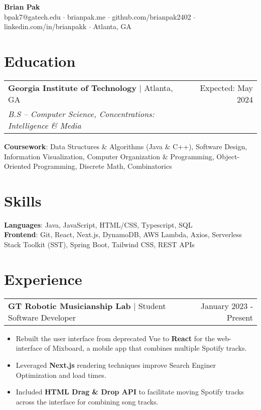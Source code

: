 \documentclass[letterpaper,11pt]{article}
\makeatletter
\newcommand{\resumeEducationHeading}[5]{
    \begin{tabular*}{0.99\textwidth}[t]{l@{\extracolsep{\fill}}r}
      \textbf{#1} $\vert$ #2 & #3 \\
      \textit{\small#4} & \textit{\small #5} \\
    \end{tabular*}\vspace{0.5pt}
}
\newcommand{\resumeExperienceHeading}[3]{
    \begin{tabular*}{0.99\textwidth}[t]{l@{\extracolsep{\fill}}r}
      \textbf{#1} $\vert$ {#2} & {#3} \\
    \end{tabular*}\vspace{-3pt}
}
\newcommand{\resumeItemListStart}{\begin{itemize}[noitemsep]\vspace{-4pt}}
\newcommand{\resumeItemListEnd}{\end{itemize}}
\makeatother
\begin{document}
\begin{center}
  \textbf{\huge Brian Pak} \\
  \vspace*{0.1cm}
  {bpak7@gatech.edu} $\cdot$ {brianpak.me} $\cdot$ {github.com/brianpak2402} $\cdot$ {linkedin.com/in/brianpakk}  $\cdot$ Atlanta, GA
\end{center}

\section{Education}
    \resumeEducationHeading
      {Georgia Institute of Technology}{Atlanta, GA}{Expected: May 2024}
      {B.S -- Computer Science, Concentrations: Intelligence \& Media}{\vspace{0.1cm}} 
    \textbf{Coursework}{: Data Structures \& Algorithms (Java \& C++), Software Design, Information Visualization, Computer Organization \& Programming, Object-Oriented Programming, Discrete Math, Combinatorics} \\

\section{Skills}
    \textbf{Languages}{: Java, JavaScript, HTML/CSS, Typescript, SQL} \\
    \textbf{Frontend}{: Git, React, Next.js,  DynamoDB, AWS Lambda, Axios, Serverless Stack Toolkit (SST), Spring Boot, Tailwind CSS, REST APIs}

\section{Experience}
  \resumeExperienceHeading{GT Robotic Musicianship Lab}{Student Software Developer}{January 2023 - Present}
    \resumeItemListStart
      \item {Rebuilt the user interface from deprecated Vue to \textbf{React} for the web-interface of Mixboard, a mobile app that combines multiple Spotify tracks.}
      \item {Leveraged \textbf{Next.js} rendering techniques improve Search Enginer Optimization and load times.}
      \item {Included \textbf{HTML Drag \& Drop API} to facilitate moving Spotify tracks across the interface for combining song tracks.}
    \resumeItemListEnd
  
\end{document}
